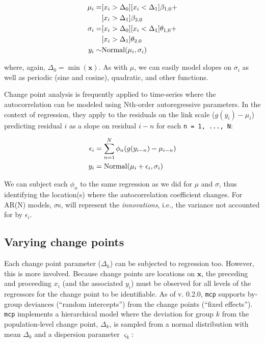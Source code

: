 \documentclass[
  american,
]{article}
\begin{document}
\begin{equation}
\label{eq-variance}
\begin{aligned}
\mu_i = & [x_i > \Delta_0] [x_i < \Delta_1] \beta_{1, 0} + \\
      & [x_i > \Delta_1] \beta_{2, 0} \\
\sigma_i = & [x_i > \Delta_0] [x_i < \Delta_1] \theta_{1, 0} + \\
           & [x_i > \Delta_1] \theta_{2, 0} \\
y_i \sim & {\rm Normal}(\mu_i, \sigma_i)
\end{aligned}
\end{equation}

where, again, \(\Delta_0 = \min(\mathbf{x})\). As with \(\mu\), we can easily model slopes on \(\sigma_i\) as well as periodic (sine and cosine), quadratic, and other functions.

Change point analysis is frequently applied to time-series where the autocorrelation can be modeled using Nth-order autoregressive parameters. In the context of regression, they apply to the residuals on the link scale (\(g(y_i) - \mu_i\)) predicting residual \(i\) as a slope on residual \(i-n\) for each \texttt{n\ =\ 1,\ ...,\ N}:

\begin{equation}
\begin{aligned}
  \epsilon_i & = \sum_{n=1}^{N} \phi_n(g(y_{i-n}) - \mu_{i-n}) \\
  y_i & = {\rm Normal}(\mu_i + \epsilon_i, \sigma_i)
\end{aligned}
\end{equation}

We can subject each \(\phi_n\) to the same regression as we did for \(\mu\) and \(\sigma\), thus identifying the location(s) where the autocorrelation coefficient changes. For AR(N) models, \(\sigma\)s, will represent the \emph{innovations}, i.e., the variance not accounted for by \(\epsilon_i\).

\hypertarget{varying-change-points}{%
\subsection{Varying change points}\label{varying-change-points}}

Each change point parameter (\(\Delta_k\)) can be subjected to regression too. However, this is more involved. Because change points are locations on \(\mathbf{x}\), the preceding and proceeding \(x_i\) (and the associated \(y_i\)) must be observed for all levels of the regressors for the change point to be identifiable. As of v. 0.2.0, \texttt{mcp} supports by-group deviances (``random intercepts'') from the change points (``fixed effects''). \texttt{mcp} implements a hierarchical model where the deviation for group \(k\) from the population-level change point, \(\Delta_k\), is sampled from a normal distribution with mean \(\Delta_k\) and a dispersion parameter \(\varsigma_k\):
\end{document}
